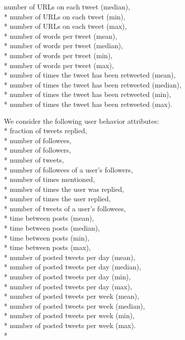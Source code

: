 \documentclass[11pt]{article}
\begin{document}
number of URLs on each tweet (median),\\*
number of URLs on each tweet (min),\\*
number of URLs on each tweet (max),\\*
number of words per tweet (mean),\\*
number of words per tweet (median),\\*
number of words per tweet (min),\\*
number of words per tweet (max),\\*
number of times the tweet has been retweeted (mean),\\*
number of times the tweet has been retweeted (median), \\*
number of times the tweet has been retweeted (min), \\*
number of times the tweet has been retweeted (max).

\newpage
We consider the following user behavior attributes: \\*
\newline
fraction of tweets replied,\\*
number of followees,\\*
number of followers,\\*
number of tweets,\\*
number of followees of a user's followers,\\*
number of times mentioned,\\*
number of times the user was replied,\\*
number of times the user replied,\\*
number of tweets of a user's followees,\\*
time between posts (mean),\\*
time between posts (median),\\*
time between posts  (min),\\*
time between posts (max),\\*
number of posted tweets per day (mean),\\*
number of posted tweets per day (median),\\*
number of posted tweets per day (min),\\*
number of posted tweets per day (max),\\*
number of posted tweets per week (mean),\\*
number of posted tweets per week (median),\\*
number of posted tweets per week (min),\\*
number of posted tweets per week (max).\\*
\end{document}
